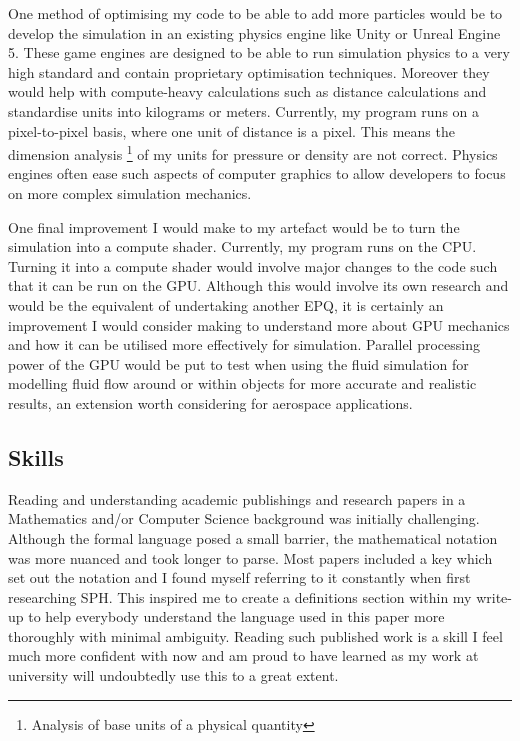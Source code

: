 \documentclass[write-up.tex]{subfiles}
\begin{document}
One method of optimising my code to be able to add more particles would be to develop the simulation in an existing physics engine like Unity or Unreal Engine 5. These game engines are designed to be able to run simulation physics to a very high standard and contain proprietary optimisation techniques. Moreover they would help with compute-heavy calculations such as distance calculations and standardise units into kilograms or meters. Currently, my program runs on a pixel-to-pixel basis, where one unit of distance is a pixel. This means the dimension analysis \footnote{Analysis of base units of a physical quantity} of my units for pressure or density are not correct. Physics engines often ease such aspects of computer graphics to allow developers to focus on more complex simulation mechanics.

One final improvement I would make to my artefact would be to turn the simulation into a compute shader. Currently, my program runs on the CPU. Turning it into a compute shader would involve major changes to the code such that it can be run on the GPU. Although this would involve its own research and would be the equivalent of undertaking another EPQ, it is certainly an improvement I would consider making to understand more about GPU mechanics and how it can be utilised more effectively for simulation. Parallel processing power of the GPU would be put to test when using the fluid simulation for modelling fluid flow around or within objects for more accurate and realistic results, an extension worth considering for aerospace applications.

 \subsection{Skills}
Reading and understanding academic publishings and research papers in a Mathematics and/or Computer Science background was initially challenging. Although the formal language posed a small barrier, the mathematical notation was more nuanced and took longer to parse. Most papers included a key which set out the notation and I found myself referring to it constantly when first researching SPH. This inspired me to create a definitions section within my write-up to help everybody understand the language used in this paper more thoroughly with minimal ambiguity. Reading such published work is a skill I feel much more confident with now and am proud to have learned as my work at university will undoubtedly use this to a great extent.
\end{document}

